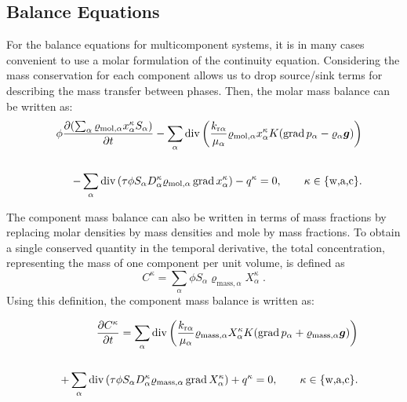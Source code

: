 \subsection{Balance Equations}
For the balance equations for multicomponent systems, it is in many
cases convenient to use a molar formulation of the continuity
equation. Considering the mass conservation for each component allows
us to drop source/sink terms for describing the mass transfer between
phases. Then, the
molar mass balance can be written as:
%
\begin{eqnarray}
  \label{A3:eqmass1}
  && \phi \frac{\partial (\sum_\alpha \varrho_{\text{mol}, \alpha}
    x_\alpha^\kappa S_\alpha )}{\partial t} \nonumber 
 - \sum\limits_\alpha \operatorname{div} \left( \frac{k_{\text{r}
        \alpha}}{\mu_\alpha} \varrho_{\text{mol}, \alpha}
    x_\alpha^\kappa K (\operatorname{grad} p_\alpha -
    \varrho_{\alpha} \boldsymbol{g}) \right) \nonumber \\
  \nonumber \\
  && - \sum\limits_\alpha \operatorname{div} \left( \tau \phi S_\alpha D_\alpha^\kappa \varrho_{\text{mol},
      \alpha} \operatorname{grad} x_\alpha^\kappa \right) \nonumber 
 - q^\kappa = 0, \qquad \kappa \in \{\text{w,a,c}\}.
\end{eqnarray}

The component mass balance can also be written in terms of mass fractions 
by replacing molar densities by mass densities and mole by mass fractions.
To obtain a single conserved quantity in the temporal derivative, the total 
concentration, representing the mass of one component per unit volume, is defined as
\begin{displaymath}
C^\kappa = \sum_\alpha \phi S_\alpha \varrho_{\text{mass},\alpha} X_\alpha^\kappa \; .
\end{displaymath}
Using this definition, the component mass balance is written as:

\begin{eqnarray}
  \label{A3:eqmass2}
  &&  \frac{\partial C^\kappa}{\partial t} = 
  \sum\limits_\alpha \operatorname{div} \left( \frac{k_{\text{r}
        \alpha}}{\mu_\alpha} \varrho_{\text{mass}, \alpha}
    X_\alpha^\kappa K (\operatorname{grad} p_\alpha +
    \varrho_{\text{mass}, \alpha} \boldsymbol{g}) \right) \nonumber \\
  \nonumber \\
  && + \sum\limits_\alpha \operatorname{div} \left( \tau \phi S_\alpha D_\alpha^\kappa \varrho_{\text{mass},
      \alpha} \operatorname{grad} X_\alpha^\kappa \right) \nonumber 
 + q^\kappa = 0, \qquad \kappa \in \{\text{w,a,c}\}.
\end{eqnarray}


